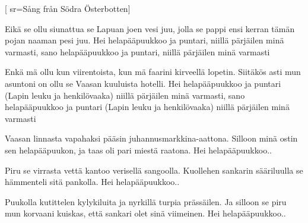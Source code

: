 [ 							
	sr={Sång från Södra Österbotten}]		
	
\beginverse*						
Eikä se ollu siunattua se Lapuan joen vesi juu,
jolla se pappi ensi kerran tämän pojan naaman
pesi juu. 
Hei helapääpuukkoo ja puntari, niillä pärjäilen 
minä varmasti, sano
helapääpuukkoo ja puntari, niillä pärjäilen
minä varmasti
\endverse						

\beginverse				
Enkä mä ollu kun viirentoista,
kun mä faarini kirveellä lopetin.
Siitäkös asti mun asuntoni on ollu
se Vaasan kuuluista hotelli.
Hei helapääpuukkoo ja puntari (Lapin leuku ja henkilövaaka)
niillä pärjäilen minä varmasti,
sano helapääpuukkoo ja puntari (Lapin leuku ja henkilövaaka)
niillä pärjäilen minä varmasti
\endverse

\beginverse				
Vaasan linnasta vapahaksi pääsin juhannusmarkkina-aattona.
Silloon minä ostin sen helapääpuukon,
ja taas oli pari miestä raatona.
Hei helapääpuukkoo..
\endverse

\beginverse				
Piru se virrasta vettä kantoo verisellä sangoolla.
Kuollehen sankarin sääriluulla se hämmenteli sitä pankolla.
Hei helapääpuukkoo..
\endverse

\beginverse				
Puukolla kutittelen kylykiluita ja nyrkillä turpia prässäilen.
Ja silloon se piru mun korvaani kuiskas, että sankari olet sinä viimeinen.
Hei helapääpuukkoo..
\endverse				
\endsong		

